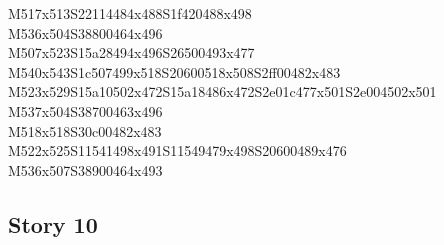 \documentclass{article}
\begin{document}
\begin{multicols}{5}
\begin{center}
M517x513S22114484x488S1f420488x498 %
\\M536x504S38800464x496 %
\\M507x523S15a28494x496S26500493x477 %
\\M540x543S1c507499x518S20600518x508S2ff00482x483 %
\\M523x529S15a10502x472S15a18486x472S2e01c477x501S2e004502x501 %
\\M537x504S38700463x496 %
\\M518x518S30c00482x483 %
\\M522x525S11541498x491S11549479x498S20600489x476 %
\\M536x507S38900464x493 %
\vfil

\end{center}
\end{multicols}

\subsection{Story 10}
\end{document}
